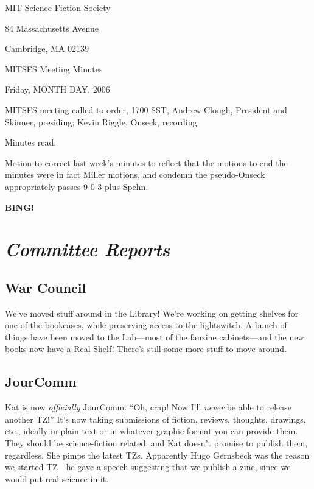 \documentclass[10pt]{article}
\newcommand{\bing}{{\bf BING!} }
\newcommand{\goto}[1]{\bing \vskip 12pt \section*{{\em{#1}}}}
\newcommand{\ps}{ plus Spehn\xspace}
\begin{document}
\begin{center}

MIT Science Fiction Society

84 Massachusetts Avenue

Cambridge, MA 02139

\vspace{12pt}

MITSFS Meeting Minutes

Friday, MONTH DAY, 2006

\end{center}

\vspace{18pt}

\setlength{\parskip}{6pt}

\noindent
MITSFS meeting called to order, 1700 SST,
Andrew Clough, President and Skinner, presiding; Kevin Riggle, Onseck, recording.

Minutes read.

Motion to correct last week's minutes to reflect that the motions to end the minutes were in fact
Miller motions, and condemn the pseudo-Onseck appropriately passes 9-0-3\ps.

\goto{Committee Reports}


\subsection*{War Council}
We've moved stuff around in the Library!  We're working on getting shelves for one of the bookcases,
while preserving access to the lightswitch.  A bunch of things have been moved to the Lab---most of
the fanzine cabinets---and the new books now have a Real Shelf!  There's still some more stuff to
move around.


\subsection*{JourComm}
Kat is now \emph{officially} JourComm.  ``Oh, crap!  Now I'll \emph{never} be able to release 
another TZ!''  It's now taking submissions of fiction, reviews, thoughts, drawings, etc., ideally
in plain text or in whatever graphic format you can provide them.  They should be science-fiction 
related, and Kat doesn't promise to publish them, regardless.  She pimps the latest TZs.  Apparently
Hugo Gernsbeck was the reason we started TZ---he gave a speech suggesting that we publish a zine, 
since we would put real science in it.
\end{document}
